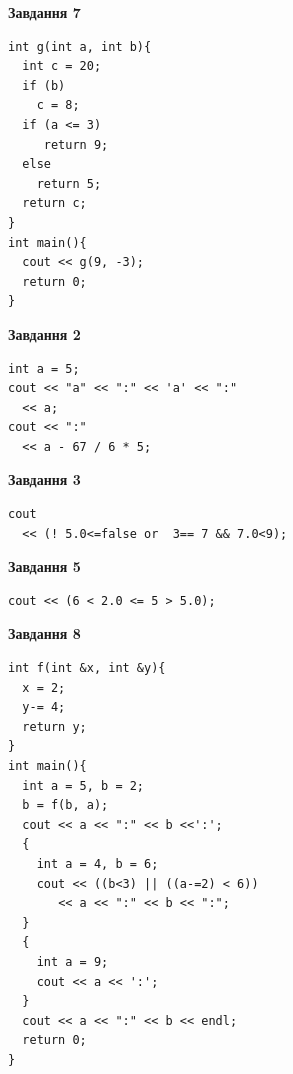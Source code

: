 \documentclass[12pt, ukrainian]{article}
\begin{document}
{\begin {large}
\begin{minipage}[t]{7.0cm}
\begin{center}
\textbf{Завдання 7}
\end{center}
\vspace{-8mm}

\begin{verbatim}
int g(int a, int b){
  int c = 20;
  if (b)
    c = 8;
  if (a <= 3)
     return 9;
  else
    return 5;
  return c;
}
int main(){
  cout << g(9, -3);
  return 0;
}
\end{verbatim}

\end{minipage}
\vline \hspace{1mm}
\begin{minipage}[t]{11.0cm}

\begin{center}
\textbf{Завдання 2}
\end{center}
\vspace{-8mm}

\begin{verbatim}
int a = 5;
cout << "a" << ":" << 'a' << ":" 
  << a;
cout << ":" 
  << a - 67 / 6 * 5;
\end{verbatim}



\begin{center}
\textbf{Завдання 3}
\end{center}
\vspace{-8mm}

\begin{verbatim}
cout 
  << (! 5.0<=false or  3== 7 && 7.0<9);
\end{verbatim}



\begin{center}
\textbf{Завдання 5}
\end{center}
\vspace{-8mm}

\begin{verbatim}
cout << (6 < 2.0 <= 5 > 5.0);
\end{verbatim}



\begin{center}
\textbf{Завдання 8}
\end{center}
\vspace{-8mm}

\begin{verbatim}
int f(int &x, int &y){
  x = 2;
  y-= 4;
  return y;
}
int main(){
  int a = 5, b = 2;
  b = f(b, a);
  cout << a << ":" << b <<':';
  {
    int a = 4, b = 6;
    cout << ((b<3) || ((a-=2) < 6))
       << a << ":" << b << ":";
  }
  {
    int a = 9;
    cout << a << ':';
  }
  cout << a << ":" << b << endl;
  return 0;
}
\end{verbatim}


\end{minipage}
\end{large}}
\end{document}
